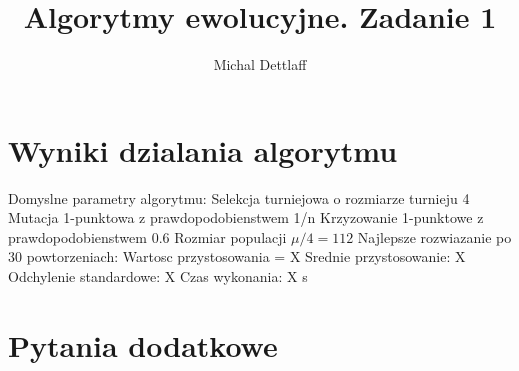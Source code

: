 \documentclass[11pt]{article}
\begin{document}
\title{Algorytmy ewolucyjne. Zadanie 1}
\author{Michal Dettlaff}
\maketitle

\section{Wyniki dzialania algorytmu}

\noindent
Domyslne parametry algorytmu:\newline
Selekcja turniejowa o rozmiarze turnieju 4\newline
Mutacja 1-punktowa z prawdopodobienstwem 1/n\newline
Krzyzowanie 1-punktowe z prawdopodobienstwem 0.6\newline
Rozmiar populacji $ \mu/4 = 112 $\newline
\newline
Najlepsze rozwiazanie po 30 powtorzeniach:\newline
Wartosc przystosowania = X\newline
Srednie przystosowanie: X\newline
Odchylenie standardowe: X\newline
Czas wykonania: X s

\section{Pytania dodatkowe}
\end{document}
